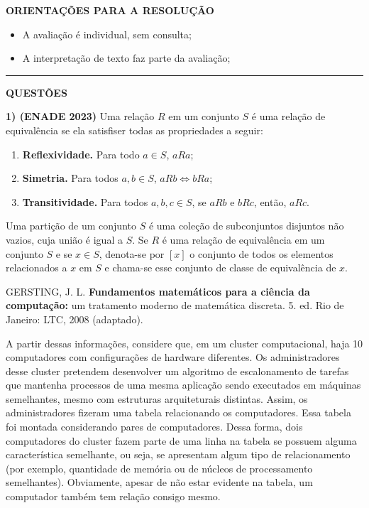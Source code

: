 \documentclass[12pt,a4paper]{article}
\begin{document}
\textbf{ORIENTAÇÕES PARA A RESOLUÇÃO}  

\begin{itemize}
    \item A avaliação é individual, sem consulta;
    \item A interpretação de texto faz parte da avaliação;
\end{itemize}

\vspace{0.5cm}

\begin{center}
    \rule{\textwidth}{0.4pt}
    \textbf{QUESTÕES}
\end{center}

\vspace{0.5cm}

\textbf{1) (ENADE 2023)} Uma relação $R$ em um conjunto $S$ é uma relação de equivalência se ela satisfiser todas as propriedades a seguir:
\begin{enumerate}
    \item \textbf{Reflexividade.} Para todo $a \in S$, $a R a$;
    \item \textbf{Simetria.} Para todos $a, b \in S$, $a R b \Leftrightarrow b R a$;
    \item \textbf{Transitividade.} Para todos $a, b, c \in S$, se $a R b$ e $b R c$, então, $a R c$.
\end{enumerate}

Uma partição de um conjunto $S$ é uma coleção de subconjuntos disjuntos não vazios, cuja união é igual a $S$. Se $R$ é uma relação de equivalência em um conjunto $S$ e se $x \in S$, denota-se por $[x]$ o conjunto de todos os elementos relacionados a $x$ em $S$ e chama-se esse conjunto de classe de equivalência de $x$.

\vspace{0.2cm}
\footnotesize
GERSTING, J. L. \textbf{Fundamentos matemáticos para a ciência da computação:} um tratamento moderno de matemática discreta. 5. ed. Rio de Janeiro: LTC, 2008 (adaptado).
\normalsize
\vspace{0.2cm}

A partir dessas informações, considere que, em um cluster computacional, haja 10 computadores com configurações de hardware diferentes. Os administradores desse cluster pretendem desenvolver um algoritmo de escalonamento de tarefas que mantenha processos de uma mesma aplicação sendo executados em máquinas semelhantes, mesmo com estruturas arquiteturais distintas. Assim, os administradores fizeram uma tabela relacionando os computadores. Essa tabela foi montada considerando pares de computadores. Dessa forma, dois computadores do cluster fazem parte de uma linha na tabela se possuem alguma característica semelhante, ou seja, se apresentam algum tipo de relacionamento (por exemplo, quantidade de memória ou de núcleos de processamento semelhantes). Obviamente, apesar de não estar evidente na tabela, um computador também tem relação consigo mesmo.
\end{document}
